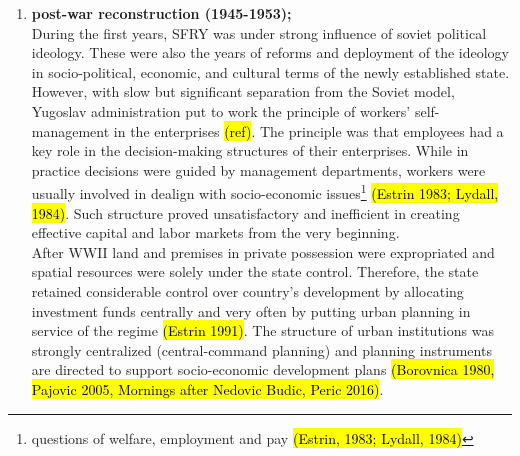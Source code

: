 \documentclass[11pt]{report}
\begin{document}
\begin{enumerate}

\item  \textbf{post-war reconstruction (1945-1953);}
\\
During the first years, SFRY was under strong influence of soviet political ideology. These were also the years of reforms and deployment of the ideology in socio-political, economic, and cultural terms of the newly established state. However, with slow but significant separation from the Soviet model, Yugoslav administration put to work the principle of workers' self-management in the enterprises \hl{(ref)}. The principle was that employees  had  a  key  role  in  the  decision-making structures  of  their enterprises. While in practice decisions  were  guided  by  management departments,  workers were usually involved in dealign with socio-economic issues\footnote{questions of welfare, employment and pay \hl{(Estrin,  1983; Lydall,  1984)}} \hl{(Estrin 1983; Lydall,  1984)}. Such structure proved unsatisfactory and inefficient in creating effective capital  and  labor  markets from the very beginning.
\\
After WWII land and premises in private possession were expropriated and spatial resources were solely under the state control. Therefore, the state retained considerable control over country's development by allocating investment funds centrally and very often by putting urban planning in service of the regime \hl{(Estrin 1991)}. The structure of urban institutions was strongly centralized (central-command planning) and planning instruments are directed to support socio-economic development plans \hl{(Borovnica 1980, Pajovic 2005, Mornings after Nedovic Budic, Peric 2016)}. 


\end{enumerate}
\end{document}
